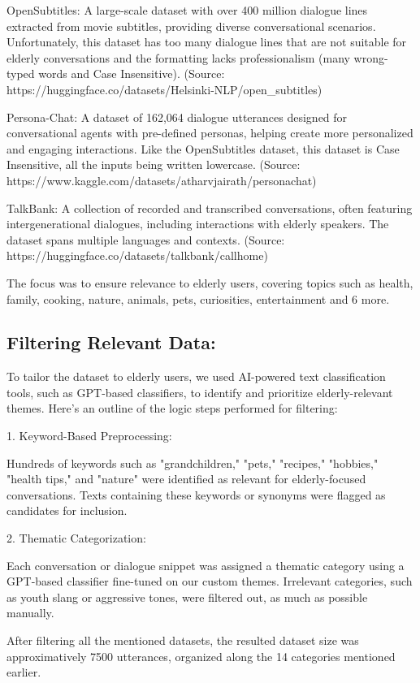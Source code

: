 \documentclass[runningheads,a4paper,11pt]{report}
\begin{document}
OpenSubtitles: A large-scale dataset with over 400 million dialogue lines extracted from movie subtitles, providing diverse conversational scenarios. Unfortunately, this dataset has too many dialogue lines that are not suitable for elderly conversations and the formatting lacks professionalism (many wrong-typed words and Case Insensitive). (Source: https://huggingface.co/datasets/Helsinki-NLP/open\_subtitles)

Persona-Chat: A dataset of 162,064 dialogue utterances designed for conversational agents with pre-defined personas, helping create more personalized and engaging interactions. Like the OpenSubtitles dataset, this dataset is Case Insensitive, all the inputs being written lowercase. (Source: https://www.kaggle.com/datasets/atharvjairath/personachat)

TalkBank: A collection of recorded and transcribed conversations, often featuring intergenerational dialogues, including interactions with elderly speakers. The dataset spans multiple languages and contexts. (Source: https://huggingface.co/datasets/talkbank/callhome)

The focus was to ensure relevance to elderly users, covering topics such as health, family, cooking, nature, animals, pets, curiosities, entertainment and 6 more.

\subsection{Filtering Relevant Data:}
 To tailor the dataset to elderly users, we used AI-powered text classification tools, such as GPT-based classifiers, to identify and prioritize elderly-relevant themes. Here’s an outline of the logic steps performed for filtering:

 1. Keyword-Based Preprocessing:

Hundreds of keywords such as "grandchildren," "pets," "recipes," "hobbies," "health tips," and "nature" were identified as relevant for elderly-focused conversations.
Texts containing these keywords or synonyms were flagged as candidates for inclusion.

 2. Thematic Categorization:

Each conversation or dialogue snippet was assigned a thematic category using a GPT-based classifier fine-tuned on our custom themes.
Irrelevant categories, such as youth slang or aggressive tones, were filtered out, as much as possible manually.

After filtering all the mentioned datasets, the resulted dataset size was approximatively 7500 utterances, organized along the 14 categories mentioned earlier.
\end{document}
